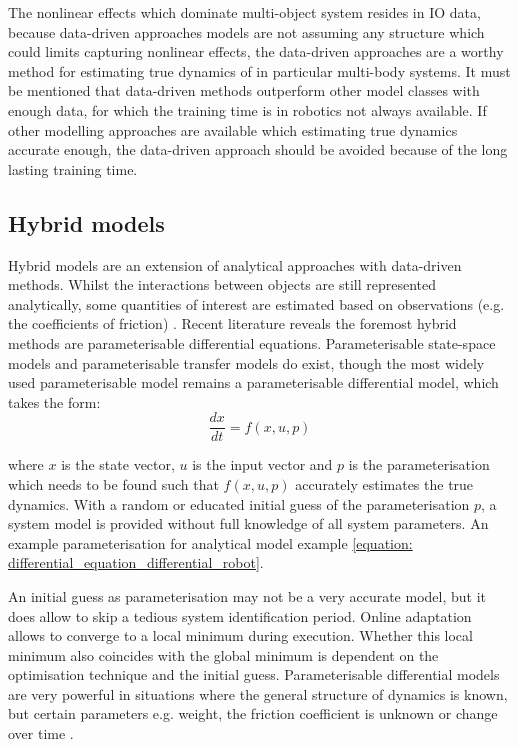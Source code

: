 The nonlinear effects which dominate multi-object system resides in \ac{IO} data, because data-driven approaches models are not assuming any structure which could limits capturing nonlinear effects, the data-driven approaches are a worthy method for estimating true dynamics of in particular multi-body systems. It must be mentioned that data-driven methods outperform other model classes with enough data, for which the training time is in robotics not always available. If other modelling approaches are available which estimating true dynamics accurate enough, the data-driven approach should be avoided because of the long lasting training time.  

\subsection{Hybrid models}
\label{subsection: hybrid_models}
Hybrid models are an extension of analytical approaches with data-driven methods. Whilst the interactions between objects are still represented analytically, some quantities of interest are estimated based on observations (e.g. the coefficients of friction) \cite{stuber_lets_2020}. Recent literature reveals the foremost hybrid methods are parameterisable differential equations. Parameterisable state-space models and parameterisable transfer models do exist, though the most widely used parameterisable model remains a parameterisable differential model, which takes the form:
\begin{equation}
   \frac{dx}{dt}=f(x, u, p) 
   \label{equation: parameterisable_model}
\end{equation}

where $x$ is the state vector, $u$ is the input vector and $p$ is the parameterisation which needs to be found such that $f(x,u,p)$ accurately estimates the true dynamics. With a random or educated initial guess of the parameterisation $p$, a system model is provided without full knowledge of all system parameters. An example parameterisation for analytical model example \cref{equation: differential_equation_differential_robot}.


An initial guess as parameterisation may not be a very accurate model, but it does allow to skip a tedious system identification period. Online adaptation allows to converge to a local minimum during execution. Whether this local minimum also coincides with the global minimum is dependent on the optimisation technique and the initial guess. Parameterisable differential models are very powerful in situations where the general structure of dynamics is known, but certain parameters e.g. weight, the friction coefficient is unknown or change over time \cite{seegmiller_vehicle_2013}.\\

